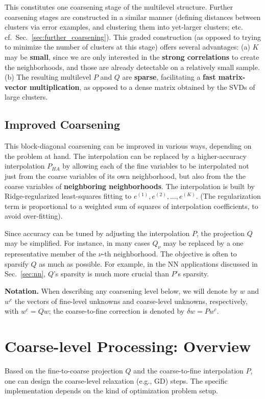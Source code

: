 \documentclass{article} %
\begin{document}
This constitutes one coarsening stage of the multilevel structure. Further coarsening stages are constructed in a similar manner (defining distances between clusters via error examples, and clustering them into yet-larger clusters; etc. cf.~Sec.~\ref{sec:further_coarsening}). This graded construction (as opposed to trying to minimize the number of clusters at this stage) offers several advantages: (a) $K$ may be \textbf{small}, since we are only interested in the \textbf{strong correlations} to create the neighborhoods, and those are already detectable on a relatively small sample. (b) The resulting multilevel $P$ and $Q$ are \textbf{sparse}, facilitating a \textbf{fast matrix-vector multiplication}, as opposed to a dense matrix obtained by the SVDs of large clusters.

\subsection{Improved Coarsening}
\label{sec:improved_coarsening}
This block-diagonal coarsening can be improved in various ways, depending on the problem at hand. The interpolation can be replaced by a higher-accuracy interpolation $P_{HA}$ by allowing each of the fine variables to be interpolated not just from the coarse variables of its own neighborhood, but also from the the coarse variables of \textbf{neighboring neighborhoods}. The interpolation is built by Ridge-regularized least-squares fitting to $e^{(1)}, e^{(2)}, \dots, e^{(K)}$. (The regularization term is proportional to a weighted sum of squares of interpolation coefficients, to avoid over-fitting).

Since accuracy can be tuned by adjusting the interpolation $P$, the projection $Q$ may be simplified. For instance, in many cases $Q_{\nu}$ may be replaced by a one representative member of the $\nu$-th neighborhood. The objective is often to sparsify $Q$ as much as possible. For example, in the NN applications discussed in Sec.~\ref{sec:nn}, $Q$'s sparsity is much more crucial than $P$'s sparsity.

\textbf{Notation.} When describing any coarsening level below, we will denote by $w$ and $w^c$ the vectors of fine-level unknowns and coarse-level unknowns, respectively, with $w^c = Qw$; the coarse-to-fine correction is denoted by $\delta w = P w^c$.


\section{Coarse-level Processing: Overview}
\label{sec:coarse_overview}
Based on the fine-to-coarse projection $Q$ and the coarse-to-fine interpolation $P$, one can design the coarse-level relaxation (e.g., GD) steps. The specific implementation depends on the kind of optimization problem setup.
\end{document}
